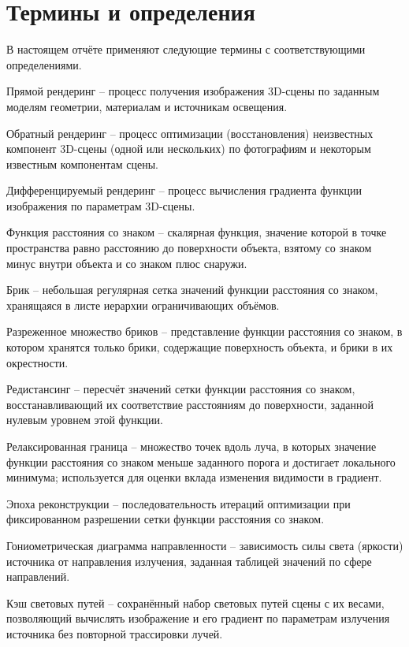 \chapter*{Термины и определения}

В настоящем отчёте применяют следующие термины с соответствующими определениями.

Прямой рендеринг -- процесс получения изображения 3D-сцены по заданным моделям геометрии, материалам и источникам освещения.

Обратный рендеринг -- процесс оптимизации (восстановления) неизвестных компонент 3D-сцены (одной или нескольких) по фотографиям и некоторым известным компонентам сцены.

Дифференцируемый рендеринг -- процесс вычисления градиента функции изображения по параметрам 3D-сцены.

Функция расстояния со знаком -- скалярная функция, значение которой в точке пространства равно расстоянию до поверхности объекта, взятому со знаком минус внутри объекта и со знаком плюс снаружи.

Брик -- небольшая регулярная сетка значений функции расстояния со знаком, хранящаяся в листе иерархии ограничивающих объёмов.

Разреженное множество бриков -- представление функции расстояния со знаком, в котором хранятся только брики, содержащие поверхность объекта, и брики в их окрестности.

Редистансинг -- пересчёт значений сетки функции расстояния со знаком, восстанавливающий их соответствие расстояниям до поверхности, заданной нулевым уровнем этой функции.

Релаксированная граница -- множество точек вдоль луча, в которых значение функции расстояния со знаком меньше заданного порога и достигает локального минимума; используется для оценки вклада изменения видимости в градиент.

Эпоха реконструкции -- последовательность итераций оптимизации при фиксированном разрешении сетки функции расстояния со знаком.

Гониометрическая диаграмма направленности -- зависимость силы света (яркости) источника от направления излучения, заданная таблицей значений по сфере направлений.

Кэш световых путей -- сохранённый набор световых путей сцены с их весами, позволяющий вычислять изображение и его градиент по параметрам излучения источника без повторной трассировки лучей.

